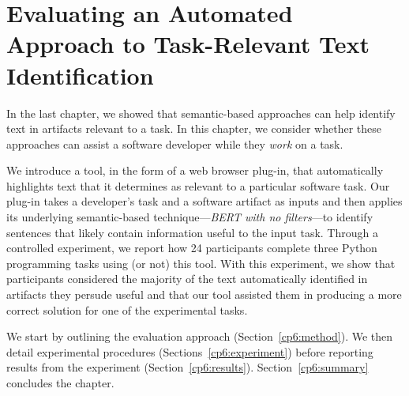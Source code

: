 \setcounter{chapter}{5}


\chapter{Evaluating an Automated Approach to Task-Relevant Text Identification}
\label{ch:assisting}


In the last chapter, we showed that semantic-based approaches can help identify text in artifacts relevant to a task. 
In this chapter, we consider whether these approaches can assist a software developer while they \textit{work} on a task.




We introduce a tool, in the form of a web browser plug-in, that automatically highlights 
text that it determines as relevant to a particular software task.
Our plug-in takes a developer's task and a software artifact as inputs and then applies its underlying semantic-based technique---\textit{BERT with no filters}---to identify sentences that likely contain information useful to the input task.
Through a controlled experiment,  
we report
how 24 participants complete three Python
programming tasks using (or not) this tool. 
With this experiment, we show that participants considered the majority of the text automatically identified in artifacts 
they persude useful and that 
our tool assisted them in producing a more correct solution for one of the experimental tasks.


We start by outlining the evaluation approach  (Section~\ref{cp6:method}). We then
detail experimental procedures  (Sections~\ref{cp6:experiment}) before reporting
results from the experiment 
(Section~\ref{cp6:results}).
Section~\ref{cp6:summary} concludes the chapter.





%     









